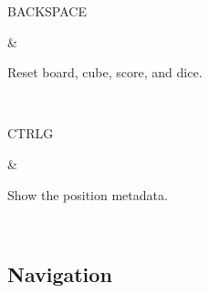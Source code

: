 \documentclass[letterpaper,10pt,english]{sphinxmanual}
\begin{document}
\begin{savenotes}
\begin{tabular}[t]{}
\begin{varwidth}[t]{}
\sphinxAtStartPar
BACKSPACE
\sphinxbeforeendvarwidth
\end{varwidth}%
&\begin{varwidth}[t]{}
\sphinxAtStartPar
Reset board, cube, score, and dice.
\sphinxbeforeendvarwidth
\end{varwidth}%
\\
\sphinxhline\begin{varwidth}[t]{}
\sphinxAtStartPar
CTRL\sphinxhyphen{}G
\sphinxbeforeendvarwidth
\end{varwidth}%
&\begin{varwidth}[t]{}
\sphinxAtStartPar
Show the position metadata.
\sphinxbeforeendvarwidth
\end{varwidth}%
\\
\sphinxbottomrule
\end{tabular}
\sphinxtableafterendhook\par
\sphinxattableend\end{savenotes}


\subsection{Navigation}
\label{\detokenize{raccourcis:navigation}}\label{\detokenize{raccourcis:raccourcis-navigation}}
\end{document}
